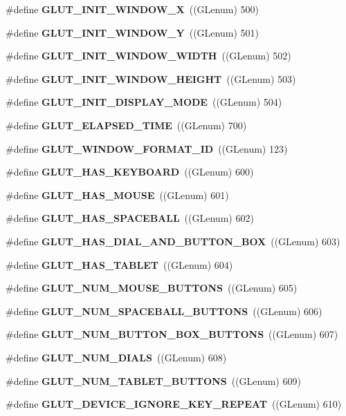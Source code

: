 \begin{DoxyCompactItemize}
\item 
\#define {\bf G\+L\+U\+T\+\_\+\+I\+N\+I\+T\+\_\+\+W\+I\+N\+D\+O\+W\+\_\+X}~((G\+Lenum) 500)
\item 
\#define {\bf G\+L\+U\+T\+\_\+\+I\+N\+I\+T\+\_\+\+W\+I\+N\+D\+O\+W\+\_\+Y}~((G\+Lenum) 501)
\item 
\#define {\bf G\+L\+U\+T\+\_\+\+I\+N\+I\+T\+\_\+\+W\+I\+N\+D\+O\+W\+\_\+\+W\+I\+D\+TH}~((G\+Lenum) 502)
\item 
\#define {\bf G\+L\+U\+T\+\_\+\+I\+N\+I\+T\+\_\+\+W\+I\+N\+D\+O\+W\+\_\+\+H\+E\+I\+G\+HT}~((G\+Lenum) 503)
\item 
\#define {\bf G\+L\+U\+T\+\_\+\+I\+N\+I\+T\+\_\+\+D\+I\+S\+P\+L\+A\+Y\+\_\+\+M\+O\+DE}~((G\+Lenum) 504)
\item 
\#define {\bf G\+L\+U\+T\+\_\+\+E\+L\+A\+P\+S\+E\+D\+\_\+\+T\+I\+ME}~((G\+Lenum) 700)
\item 
\#define {\bf G\+L\+U\+T\+\_\+\+W\+I\+N\+D\+O\+W\+\_\+\+F\+O\+R\+M\+A\+T\+\_\+\+ID}~((G\+Lenum) 123)
\item 
\#define {\bf G\+L\+U\+T\+\_\+\+H\+A\+S\+\_\+\+K\+E\+Y\+B\+O\+A\+RD}~((G\+Lenum) 600)
\item 
\#define {\bf G\+L\+U\+T\+\_\+\+H\+A\+S\+\_\+\+M\+O\+U\+SE}~((G\+Lenum) 601)
\item 
\#define {\bf G\+L\+U\+T\+\_\+\+H\+A\+S\+\_\+\+S\+P\+A\+C\+E\+B\+A\+LL}~((G\+Lenum) 602)
\item 
\#define {\bf G\+L\+U\+T\+\_\+\+H\+A\+S\+\_\+\+D\+I\+A\+L\+\_\+\+A\+N\+D\+\_\+\+B\+U\+T\+T\+O\+N\+\_\+\+B\+OX}~((G\+Lenum) 603)
\item 
\#define {\bf G\+L\+U\+T\+\_\+\+H\+A\+S\+\_\+\+T\+A\+B\+L\+ET}~((G\+Lenum) 604)
\item 
\#define {\bf G\+L\+U\+T\+\_\+\+N\+U\+M\+\_\+\+M\+O\+U\+S\+E\+\_\+\+B\+U\+T\+T\+O\+NS}~((G\+Lenum) 605)
\item 
\#define {\bf G\+L\+U\+T\+\_\+\+N\+U\+M\+\_\+\+S\+P\+A\+C\+E\+B\+A\+L\+L\+\_\+\+B\+U\+T\+T\+O\+NS}~((G\+Lenum) 606)
\item 
\#define {\bf G\+L\+U\+T\+\_\+\+N\+U\+M\+\_\+\+B\+U\+T\+T\+O\+N\+\_\+\+B\+O\+X\+\_\+\+B\+U\+T\+T\+O\+NS}~((G\+Lenum) 607)
\item 
\#define {\bf G\+L\+U\+T\+\_\+\+N\+U\+M\+\_\+\+D\+I\+A\+LS}~((G\+Lenum) 608)
\item 
\#define {\bf G\+L\+U\+T\+\_\+\+N\+U\+M\+\_\+\+T\+A\+B\+L\+E\+T\+\_\+\+B\+U\+T\+T\+O\+NS}~((G\+Lenum) 609)
\item 
\#define {\bf G\+L\+U\+T\+\_\+\+D\+E\+V\+I\+C\+E\+\_\+\+I\+G\+N\+O\+R\+E\+\_\+\+K\+E\+Y\+\_\+\+R\+E\+P\+E\+AT}~((G\+Lenum) 610)

\end{DoxyCompactItemize}
